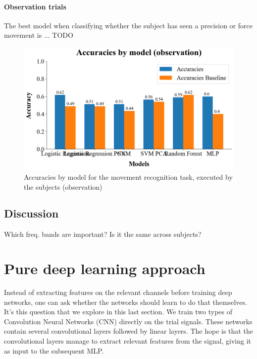 \documentclass[10pt,conference,compsocconf]{IEEEtran}
\begin{document}
\paragraph{Observation trials}
The best model when classifying whether the subject has seen a precision or force movement is ... TODO

\begin{figure}[h!]
  \center
  \includegraphics[width=\linewidth]{images/2024-12-15-14-54-12.png}
  \caption{Accuracies by model for the movement recognition task, executed by the subjects (observation)}
\end{figure}
\FloatBarrier

\subsection{Discussion}
Which freq. bands are important? Is it the same across subjects?

\section{Pure deep learning approach}
\label{sec:deeplearning}
Instead of extracting features on the relevant channels before training deep networks, one can ask whether the networks should learn to do that themselves. It's this question that we explore in this last section. We train two types of Convolution Neural Networks (CNN) directly on the trial signals. These networks contain several convolutional layers followed by linear layers. The hope is that the convolutional layers manage to extract relevant features from the signal, giving it as input to the subsequent MLP.
\end{document}
